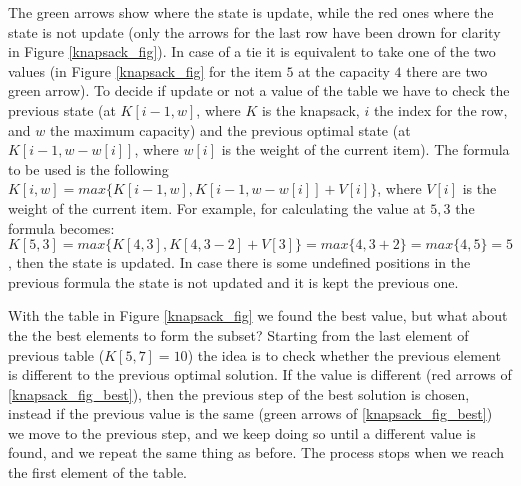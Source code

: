 The green arrows show where the state is update, while the red ones where the state is not update (only the arrows for the last row have been drown for clarity in Figure \ref{knapsack_fig}). In case of a tie it is equivalent to take one of the two values (in Figure \ref{knapsack_fig} for the item \(5\) at the capacity \(4\) there are two green arrow). To decide if update or not a value of the table we have to check the previous state (at \(K[i-1, w]\), where \(K\) is the knapsack, \(i\) the index for the row, and \(w\) the maximum capacity) and the previous optimal state (at \(K[i-1, w-w[i]]\), where \(w[i]\) is the weight of the current item). The formula to be used is the following \(K[i, w] = max \lbrace K[i-1, w], K[i-1, w-w[i]] + V[i]\rbrace \), where \(V[i]\) is the weight of the current item. For example, for calculating the value at \(5, 3\) the formula becomes: \(K[5, 3]=max \lbrace K[4, 3], K[4, 3-2] + V[3]\rbrace=max \lbrace 4, 3 + 2 \rbrace = max \lbrace 4, 5 \rbrace = 5\), then the state is updated. In case there is some undefined positions in the previous formula the state is not updated and it is kept the previous one.

With the table in Figure \ref{knapsack_fig} we found the best value, but what about the the best elements to form the subset? Starting from the last element of previous table (\(K[5, 7]=10\)) the idea is to check whether the previous element is different to the previous optimal solution. If the value is different (red arrows of \ref{knapsack_fig_best}), then the previous step of the best solution is chosen, instead if the previous value is the same (green arrows of \ref{knapsack_fig_best}) we move to the previous step, and we keep doing so until a different value is found, and we repeat the same thing as before. The process stops when we reach the first element of the table.

